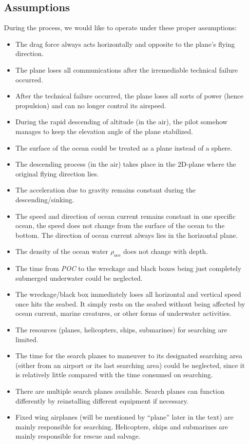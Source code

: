 \documentclass[a4paper,11pt]{article}
\begin{document}
\begin{spacing}{1.0}
\begin{itemize}
\end{itemize}



\subsection{Assumptions}\label{Assumptions}
During the process, we would like to operate under these proper assumptions:
\begin{itemize}
	\item The drag force always acts horizontally and opposite to the plane's flying direction.
	\item The plane loses all communications after the irremediable technical failure occurred.
	\item After the technical failure occurred, the plane loses all sorts of power (hence propulsion) and can no longer control its airspeed.
	\item During the rapid descending of altitude (in the air), the pilot somehow manages to keep the elevation angle of the plane stabilized.
	\item The surface of the ocean could be treated as a plane instead of a sphere.
	\item The descending process (in the air) takes place in the 2D-plane where the original flying direction lies.
	\item The acceleration due to gravity remains constant during the descending/sinking.
	\item The speed and direction of ocean current remains constant in one specific ocean, the speed does not change from the surface of the ocean to the bottom. The direction of ocean current always lies in the horizontal plane.
	\item The density of the ocean water $\rho_\text{oce}$ does not change with depth.
	\item The time from \textit{POC} to the wreckage and black boxes being just completely submerged underwater could be neglected.
	\item The wreckage/black box immediately loses all horizontal and vertical speed once hits the seabed. It simply rests on the seabed without being affected by ocean current, marine creatures, or other forms of underwater activities.
	\item The resources (planes, helicopters, ships, submarines) for searching are limited.
	\item The time for the search planes to maneuver to its designated searching area (either from an airport or its last searching area) could be neglected, since it is relatively little compared with the time consumed on searching.
	\item There are multiple search planes available. Search planes can function differently by reinstalling different equipment if necessary.
	\item Fixed wing airplanes (will be mentioned by ``plane'' later in the text) are mainly responsible for searching. Helicopters, ships and submarines are mainly responsible for rescue and salvage.
\end{itemize}




\end{spacing}
\end{document}
